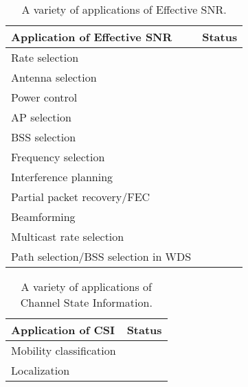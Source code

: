 \begin{table}
\centering
\begin{tabular}{lc}
\toprule
Application of Effective SNR & Status \\
\midrule
Rate selection & \cite{Halperin_ESNR}\\
Antenna selection & \cite{Halperin_ESNR}\\
Power control & \cite{Halperin_ESNR}\\
AP selection \\
BSS selection \\
Frequency selection \\
Interference planning \\
Partial packet recovery/FEC & \cite{Bhartia_FreqDiv}\\
Beamforming \\
Multicast rate selection \\
Path selection/BSS selection in WDS \\
\bottomrule
\end{tabular}
\caption{\label{tab:esnr_uses}A variety of applications of Effective SNR\@.}
\end{table}

\begin{table}
\centering
\begin{tabular}{lc}
\toprule
Application of CSI & Status \\
\midrule
Mobility classification \\
Localization \\
\bottomrule
\end{tabular}
\caption{\label{tab:csi_uses}A variety of applications of Channel State Information.}
\end{table}